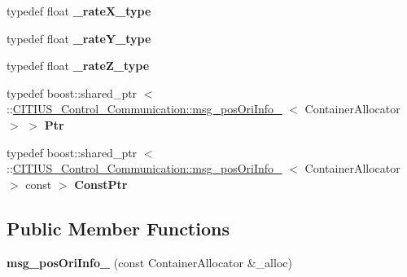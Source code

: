 \begin{DoxyCompactItemize}
\item 
\hypertarget{struct_c_i_t_i_u_s___control___communication_1_1msg__pos_ori_info___a0bd4961a11117f868fb424c0b6736c68}{typedef float {\bfseries \-\_\-rate\-X\-\_\-type}}\label{struct_c_i_t_i_u_s___control___communication_1_1msg__pos_ori_info___a0bd4961a11117f868fb424c0b6736c68}

\item 
\hypertarget{struct_c_i_t_i_u_s___control___communication_1_1msg__pos_ori_info___a2688813858c12a0fbabf439bc3ed01c0}{typedef float {\bfseries \-\_\-rate\-Y\-\_\-type}}\label{struct_c_i_t_i_u_s___control___communication_1_1msg__pos_ori_info___a2688813858c12a0fbabf439bc3ed01c0}

\item 
\hypertarget{struct_c_i_t_i_u_s___control___communication_1_1msg__pos_ori_info___ad36fee623f674959fd5a7e6b0f67fe28}{typedef float {\bfseries \-\_\-rate\-Z\-\_\-type}}\label{struct_c_i_t_i_u_s___control___communication_1_1msg__pos_ori_info___ad36fee623f674959fd5a7e6b0f67fe28}

\item 
\hypertarget{struct_c_i_t_i_u_s___control___communication_1_1msg__pos_ori_info___a02a38c53a58f3c23cac277cdca227031}{typedef boost\-::shared\-\_\-ptr\*
$<$ \-::\hyperlink{struct_c_i_t_i_u_s___control___communication_1_1msg__pos_ori_info__}{\-C\-I\-T\-I\-U\-S\-\_\-\-Control\-\_\-\-Communication\-::msg\-\_\-pos\-Ori\-Info\-\_\-}\*
$<$ \-Container\-Allocator $>$ $>$ {\bfseries \-Ptr}}\label{struct_c_i_t_i_u_s___control___communication_1_1msg__pos_ori_info___a02a38c53a58f3c23cac277cdca227031}

\item 
\hypertarget{struct_c_i_t_i_u_s___control___communication_1_1msg__pos_ori_info___a5a49c3450c89137e168252c876d91eb9}{typedef boost\-::shared\-\_\-ptr\*
$<$ \-::\hyperlink{struct_c_i_t_i_u_s___control___communication_1_1msg__pos_ori_info__}{\-C\-I\-T\-I\-U\-S\-\_\-\-Control\-\_\-\-Communication\-::msg\-\_\-pos\-Ori\-Info\-\_\-}\*
$<$ \-Container\-Allocator $>$ const  $>$ {\bfseries \-Const\-Ptr}}\label{struct_c_i_t_i_u_s___control___communication_1_1msg__pos_ori_info___a5a49c3450c89137e168252c876d91eb9}

\end{DoxyCompactItemize}
\subsection*{\-Public \-Member \-Functions}
\begin{DoxyCompactItemize}
\item 
\hypertarget{struct_c_i_t_i_u_s___control___communication_1_1msg__pos_ori_info___a68f44797f16a595c193760e9170099e6}{{\bfseries msg\-\_\-pos\-Ori\-Info\-\_\-} (const \-Container\-Allocator \&\-\_\-alloc)}\label{struct_c_i_t_i_u_s___control___communication_1_1msg__pos_ori_info___a68f44797f16a595c193760e9170099e6}

\end{DoxyCompactItemize}
